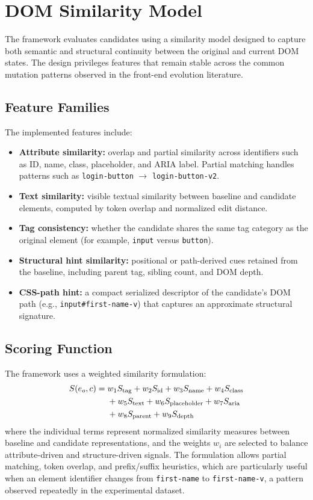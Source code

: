 \documentclass[conference]{IEEEtran}
\begin{document}
\section{DOM Similarity Model}
\label{sec:similarity}
The framework evaluates candidates using a similarity model designed to capture both semantic and structural continuity between the original and current DOM states. The design privileges features that remain stable across the common mutation patterns observed in the front-end evolution literature.

\subsection{Feature Families}
The implemented features include:
\begin{itemize}[leftmargin=1.2em]
    \item \textbf{Attribute similarity:} overlap and partial similarity across identifiers such as ID, name, class, placeholder, and ARIA label. Partial matching handles patterns such as \texttt{login-button} $\rightarrow$ \texttt{login-button-v2}.
    \item \textbf{Text similarity:} visible textual similarity between baseline and candidate elements, computed by token overlap and normalized edit distance.
    \item \textbf{Tag consistency:} whether the candidate shares the same tag category as the original element (for example, \texttt{input} versus \texttt{button}).
    \item \textbf{Structural hint similarity:} positional or path-derived cues retained from the baseline, including parent tag, sibling count, and DOM depth.
    \item \textbf{CSS-path hint:} a compact serialized descriptor of the candidate's DOM path (e.g., \texttt{input\#first-name-v}) that captures an approximate structural signature.
\end{itemize}

\subsection{Scoring Function}
The framework uses a weighted similarity formulation:
\begin{align}
S(e_o, c) = \; & w_1 S_{\text{tag}} + w_2 S_{\text{id}} + w_3 S_{\text{name}} + w_4 S_{\text{class}} \notag \\
               & + w_5 S_{\text{text}} + w_6 S_{\text{placeholder}} + w_7 S_{\text{aria}} \notag \\
               & + w_8 S_{\text{parent}} + w_9 S_{\text{depth}}
\end{align}
where the individual terms represent normalized similarity measures between baseline and candidate representations, and the weights $w_i$ are selected to balance attribute-driven and structure-driven signals. The formulation allows partial matching, token overlap, and prefix/suffix heuristics, which are particularly useful when an element identifier changes from \texttt{first-name} to \texttt{first-name-v}, a pattern observed repeatedly in the experimental dataset.
\end{document}
